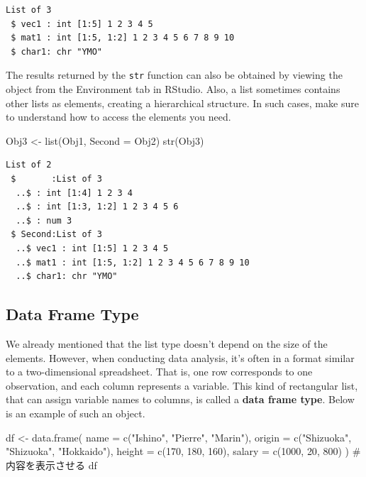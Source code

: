 \documentclass[
  a4paper,
]{book}
\newenvironment{Shaded}{\begin{snugshade}}{\end{snugshade}}
\newcommand{\AttributeTok}[1]{\textcolor[rgb]{0.40,0.45,0.13}{#1}}
\newcommand{\CommentTok}[1]{\textcolor[rgb]{0.37,0.37,0.37}{#1}}
\newcommand{\DecValTok}[1]{\textcolor[rgb]{0.68,0.00,0.00}{#1}}
\newcommand{\FunctionTok}[1]{\textcolor[rgb]{0.28,0.35,0.67}{#1}}
\newcommand{\NormalTok}[1]{\textcolor[rgb]{0.00,0.23,0.31}{#1}}
\newcommand{\OtherTok}[1]{\textcolor[rgb]{0.00,0.23,0.31}{#1}}
\newcommand{\StringTok}[1]{\textcolor[rgb]{0.13,0.47,0.30}{#1}}
\begin{document}
\begin{verbatim}
List of 3
 $ vec1 : int [1:5] 1 2 3 4 5
 $ mat1 : int [1:5, 1:2] 1 2 3 4 5 6 7 8 9 10
 $ char1: chr "YMO"
\end{verbatim}

The results returned by the \texttt{str} function can also be obtained
by viewing the object from the Environment tab in RStudio. Also, a list
sometimes contains other lists as elements, creating a hierarchical
structure. In such cases, make sure to understand how to access the
elements you need.

\begin{Shaded}
\begin{Highlighting}[]
\NormalTok{Obj3 }\OtherTok{\textless{}{-}} \FunctionTok{list}\NormalTok{(Obj1, }\AttributeTok{Second =}\NormalTok{ Obj2)}
\FunctionTok{str}\NormalTok{(Obj3)}
\end{Highlighting}
\end{Shaded}

\begin{verbatim}
List of 2
 $       :List of 3
  ..$ : int [1:4] 1 2 3 4
  ..$ : int [1:3, 1:2] 1 2 3 4 5 6
  ..$ : num 3
 $ Second:List of 3
  ..$ vec1 : int [1:5] 1 2 3 4 5
  ..$ mat1 : int [1:5, 1:2] 1 2 3 4 5 6 7 8 9 10
  ..$ char1: chr "YMO"
\end{verbatim}

\subsection{Data Frame Type}\label{data-frame-type}

We already mentioned that the list type doesn't depend on the size of
the elements. However, when conducting data analysis, it's often in a
format similar to a two-dimensional spreadsheet. That is, one row
corresponds to one observation, and each column represents a variable.
This kind of rectangular list, that can assign variable names to
columns, is called a \textbf{data frame type}. Below is an example of
such an object.

\begin{Shaded}
\begin{Highlighting}[]
\NormalTok{df }\OtherTok{\textless{}{-}} \FunctionTok{data.frame}\NormalTok{(}
  \AttributeTok{name =} \FunctionTok{c}\NormalTok{(}\StringTok{"Ishino"}\NormalTok{, }\StringTok{"Pierre"}\NormalTok{, }\StringTok{"Marin"}\NormalTok{),}
  \AttributeTok{origin =} \FunctionTok{c}\NormalTok{(}\StringTok{"Shizuoka"}\NormalTok{, }\StringTok{"Shizuoka"}\NormalTok{, }\StringTok{"Hokkaido"}\NormalTok{),}
  \AttributeTok{height =} \FunctionTok{c}\NormalTok{(}\DecValTok{170}\NormalTok{, }\DecValTok{180}\NormalTok{, }\DecValTok{160}\NormalTok{),}
  \AttributeTok{salary =} \FunctionTok{c}\NormalTok{(}\DecValTok{1000}\NormalTok{, }\DecValTok{20}\NormalTok{, }\DecValTok{800}\NormalTok{)}
\NormalTok{)}
\CommentTok{\# 内容を表示させる}
\NormalTok{df}
\end{Highlighting}
\end{Shaded}
\end{document}
